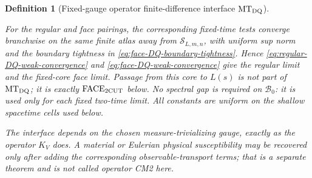 \documentclass[11pt]{article}
\newtheorem{definition}[theorem]{Definition}
\newcommand{\cB}{\mathcal B}
\begin{document}
\begin{definition}[Fixed-gauge operator finite-difference interface
$\mathrm{MT}_{\rm DQ}$]
\begin{enumerate}[label=\textup{(MT\arabic*)}]
      For the regular and face pairings, the corresponding fixed-time tests
      converge branchwise on the same finite atlas away from
      $\mathcal S_{L,m,n}$, with uniform sup norm and the boundary tightness in
      \eqref{eq:face-DQ-boundary-tightness}.  Hence
      \eqref{eq:regular-DQ-weak-convergence} and
      \eqref{eq:face-DQ-weak-convergence} give the regular limit and the
      fixed-core face limit.  Passage from this core to $L(s)$ is not part of
      $\mathrm{MT}_{\rm DQ}$; it is exactly
      $\mathrm{FACE}_{\rm 2CUT}$ below.
      No spectral gap is required on $\cB_0$: it is used only for each fixed
      two-time limit.  All constants are uniform on the shallow spacetime
      cells used below.
\end{enumerate}
The interface depends on the chosen measure-trivializing gauge, exactly as
the operator $K_V$ does.  A material or Eulerian physical susceptibility may
be recovered only after adding the corresponding observable-transport terms;
that is a separate theorem and is not called operator CM2 here.
\end{definition}
\end{document}
